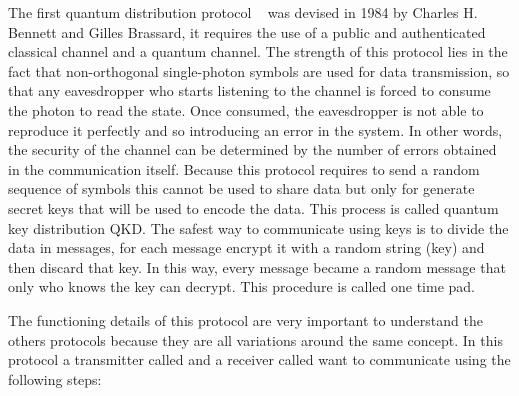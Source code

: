 The first quantum distribution protocol ~\cite{a9} was devised in 1984 by Charles H. Bennett and Gilles Brassard, it requires the use of a public and authenticated classical channel and a quantum channel. The strength of this protocol lies in the fact that non-orthogonal single-photon symbols are used for data transmission, so that any eavesdropper who starts listening to the channel is forced to consume the photon to read the state. Once consumed, the eavesdropper is not able to reproduce it perfectly and so introducing an error in the system. In other words, the security of the channel can be determined by the number of errors obtained in the communication itself. Because this protocol requires to send a random sequence of symbols this cannot be used to share data but only for generate secret keys that will be used to encode the data. This process is called quantum key distribution QKD. The safest way to communicate using keys is to divide the data in messages, for each message encrypt it with a random string (key) and then discard that key. In this way, every message became a random message that only who knows the key can decrypt. This procedure is called one time pad.

The functioning details of this protocol are very important to understand the others protocols because they are all variations around the same concept. In this protocol a transmitter called  and a receiver called  want to communicate using the following steps:

